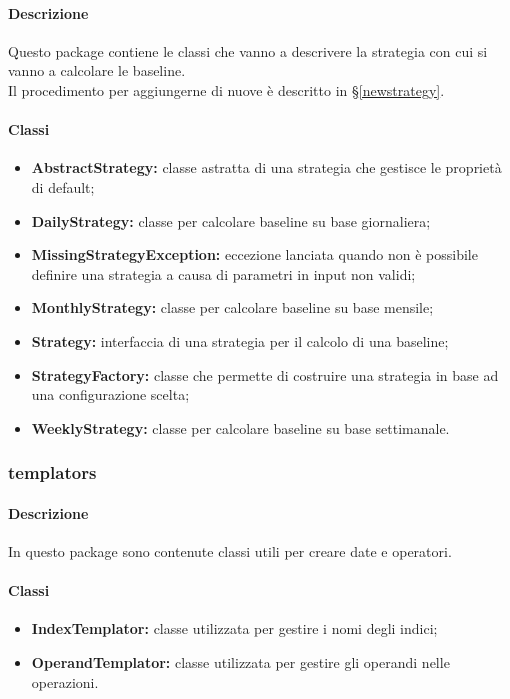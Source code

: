 		\paragraph*{Descrizione}
			Questo package contiene le classi che vanno a descrivere la strategia con cui si vanno a 
			calcolare le baseline.\\
			Il procedimento per aggiungerne di nuove è descritto in §\ref{newstrategy}.
		
		\paragraph*{Classi}
		
			\begin{itemize}
				\item \textbf{AbstractStrategy:} classe astratta di una strategia che gestisce le proprietà 
					di default;
				\item \textbf{DailyStrategy:} classe per calcolare baseline su base giornaliera;
				\item \textbf{MissingStrategyException:} eccezione lanciata quando non è possibile definire 
					una strategia a causa di parametri in input non validi;
				\item \textbf{MonthlyStrategy:} classe per calcolare baseline su base mensile;
				\item \textbf{Strategy:} interfaccia di una strategia per il calcolo di una baseline;
				\item \textbf{StrategyFactory:} classe che  permette di costruire una strategia in base 
					ad una configurazione scelta;
				\item \textbf{WeeklyStrategy:} classe per calcolare baseline su base settimanale.
			\end{itemize}

\newpage
		
	\subsubsection{templators}
		
		\paragraph*{Descrizione}
			In questo package sono contenute classi utili per creare date e operatori.
		
		\paragraph*{Classi}
			\begin{itemize}
				\item \textbf{IndexTemplator:} classe utilizzata per gestire i nomi degli indici;
				\item \textbf{OperandTemplator:} classe utilizzata per gestire gli operandi
					nelle operazioni.
			\end{itemize}
		
